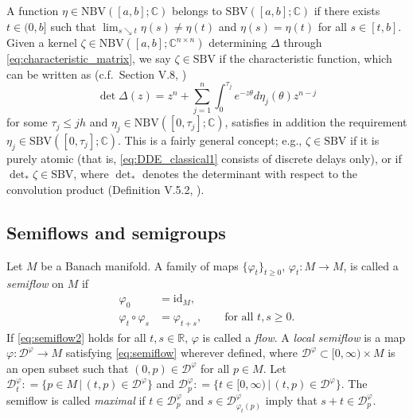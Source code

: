 \documentclass[a4paper, 12pt, oneside, reqno, notitlepage]{amsart}
\theoremstyle{plain}
\theoremstyle{definition}
\theoremstyle{remark}
\newcommand{\nbv}{\mathrm{NBV}}
\newcommand{\sbv}{\mathrm{SBV}}
\begin{document}
A function $\eta \in \nbv([a,b]; \mathbb{C})$ belongs to $ \sbv([a,b]; \mathbb{C})$ if there exists $t \in(0,b]$ such that $\lim_{s \searrow t}\eta(s) \neq \eta(t)$ and $\eta(s) = \eta(t)$ for all $s \in [t,b]$. 
Given a kernel $\zeta\in \nbv([a,b]; \mathbb{C}^{n \times n})$ determining $\Delta$ through \eqref{eq:characteristic_matrix},
we say $\zeta \in \sbv$ if the characteristic function, which can be written as (c.f.\ Section V.8, \cite{diekmann2012delay})
\begin{displaymath}
    \det \Delta(z) = z^n + \sum_{j = 1}^n \int_0^{\tau_j} e^{-z \theta} d \eta_j (\theta) z^{n-j}
\end{displaymath}
for some $\tau_j \leq j h$ and $\eta_j \in \nbv([0,\tau_j];\mathbb{C})$, satisfies in addition the requirement $\eta_j \in \sbv([0,\tau_j];\mathbb{C})$.
This is a fairly general concept; e.g., $\zeta \in \sbv$ if it is purely atomic (that is, \eqref{eq:DDE_classical1} consists of discrete delays only), or if $\det_* \zeta \in \sbv$, where $\det_*$ denotes the determinant with respect to the convolution product (Definition V.5.2, \cite{diekmann2012delay}).



\subsection{Semiflows and semigroups} 
\label{sect:SGprelim}



Let $M$ be a Banach manifold. 
A family of maps $\{\varphi_t\}_{t \geq 0}$, $\varphi_t:M \to M$, is called a \textit{semiflow} on $M$ if
\begin{subequations} \label{eq:semiflow}
    \begin{align}
    \varphi_0 &= \mathrm{id}_M, \label{eq:semiflow1}\\ 
    \varphi_t \circ \varphi_s &= \varphi_{t+s}, \qquad \text{for all } t,s \geq 0. \label{eq:semiflow2}
\end{align}\end{subequations}
If \eqref{eq:semiflow2} holds for all $t,s \in \mathbb{R}$, $\varphi$ is called a \textit{flow}.
A \textit{local semiflow} is a map $\varphi:\mathcal{D}^\varphi \to M$ satisfying \eqref{eq:semiflow} wherever defined, where  $\mathcal{D}^\varphi \subset [0,\infty) \times M$ is an open subset such that $(0,p) \in \mathcal{D}^\varphi$ for all $p \in M$.
Let $\mathcal{D}_t^\varphi : = \{p \in M \, | \, (t,p) \in \mathcal{D}^\varphi \}$ and $\mathcal{D}_p^\varphi : = \{t \in [0,\infty) \, | \, (t,p) \in \mathcal{D}^\varphi \}$.  
The semiflow is called \textit{maximal} if $t \in \mathcal{D}^\varphi_p$ and $s\in \mathcal{D}^\varphi_{\varphi_t(p)}$ imply that $s+t \in \mathcal{D}^\varphi_p$.
\end{document}
